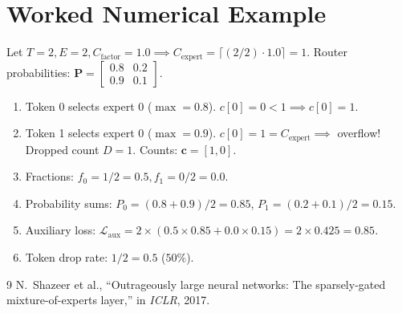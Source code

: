 \documentclass[11pt,a4paper]{article}
\theoremstyle{definition}
\begin{document}
\section{Worked Numerical Example}
Let $T = 2, E = 2, C_{\text{factor}} = 1.0 \implies C_{\text{expert}} = \lceil (2/2) \cdot 1.0 \rceil = 1$.
Router probabilities: $\mathbf{P} = \begin{bmatrix} 0.8 & 0.2 \\ 0.9 & 0.1 \end{bmatrix}$.
\begin{enumerate}
    \item Token 0 selects expert $0$ ($\max=0.8$). $c[0] = 0 < 1 \implies c[0] = 1$.
    \item Token 1 selects expert $0$ ($\max=0.9$). $c[0] = 1 = C_{\text{expert}} \implies$ overflow! Dropped count $D = 1$.
    Counts: $\mathbf{c} = [1, 0]$.
    \item Fractions: $f_0 = 1/2 = 0.5, f_1 = 0/2 = 0.0$.
    \item Probability sums: $P_0 = (0.8 + 0.9)/2 = 0.85$, $P_1 = (0.2 + 0.1)/2 = 0.15$.
    \item Auxiliary loss:
    $\mathcal{L}_{\text{aux}} = 2 \times (0.5 \times 0.85 + 0.0 \times 0.15) = 2 \times 0.425 = 0.85$.
    \item Token drop rate: $1 / 2 = 0.5$ ($50\%$).
\end{enumerate}

\begin{thebibliography}{9}
 N.~Shazeer et al., ``Outrageously large neural networks: The sparsely-gated mixture-of-experts layer,'' in \emph{ICLR}, 2017.
\end{thebibliography}
\end{document}
